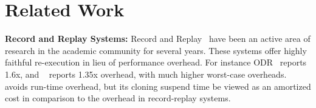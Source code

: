 
\section{Related Work}
\label{sec:related}


\iffalse  
\textbf{Software Debugging:}  
In the development phase, it is common to employ debugging tools such as gnu debugger \cite{gdb}, valgrind \cite{valgrind} or just using print statements etc.
Several development suites\cite{eclipse, visual_studio, intel_suite} often come with inbuilt debugging capabilities, to assist developers to understand their code, and debug it as they develop new applications.
In most cases these tools allow developers to look at the execution traces, and to insert watchpoints or breakpoints.
In addition they allow developers to understand the context of the application by looking at variable values at different points.
Unlike \parikshan, this practice cannot be followed in production environments, as these tools have a high overhead.  
\fi
    

\textbf{Record and Replay Systems:}  
Record and Replay~\cite{odr,revirt,guo2008r2, geels2007friday} have been an active area of research in the academic community for several years. 
These systems offer highly faithful re-execution in lieu of performance overhead. 
For instance ODR~\cite{odr} reports 1.6x, and ~\cite{aftersight} reports 1.35x overhead, with much higher worst-case overheads.
\parikshan avoids run-time overhead, but its cloning suspend time be viewed as an amortized cost in comparison to the overhead in record-replay systems.

